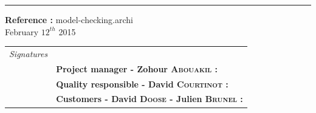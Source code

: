 \documentclass{report}
\begin{document}
\begin{titlepage}


\vspace*{4.5cm}

\noindent
\begin{minipage}{0.35\linewidth}
    \begin{flushright}
        \printauthor
    \end{flushright}
\end{minipage} \hspace{15pt}
%
\begin{minipage}{0.02\linewidth}
    \rule{1pt}{175pt}
\end{minipage} \hspace{-10pt}
%
\begin{minipage}{0.6\linewidth}
\vspace{5pt}
\newenvironment{test}{\begin{center}}{\end{center}}
\hspace{10pt}
\begin{minipage}{\linewidth} 
\textbf{Reference :} model-checking.archi ~\\
February $12^{th}$ 2015
\end{minipage}
\end{minipage}

\vspace{8cm}
\begin{minipage}{0.20\linewidth}
    \begin{flushright}
       
        \begin{tabular}{ll}
	 \textit{Signatures} & \\
			& \textbf{Project manager - Zohour \textsc{Abouakil} :} \\
            & \textbf{Quality responsible - David \textsc{Courtinot} :} \\
            & \textbf{Customers - David \textsc{Doose} - Julien \textsc{Brunel} :} \\
        \end{tabular}
    \end{flushright}
\end{minipage}

\end{titlepage}
\restoregeometry
\tableofcontents
{}
\end{document}
